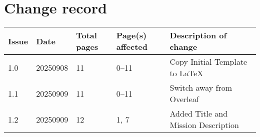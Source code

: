 
\section*{Change record}
\begin{table}[htp]
\centering
\renewcommand{\arraystretch}{1.2} %
\begin{tabularx}{\textwidth}{|l|l|l|l|X|}
\hline
Issue & Date & Total pages & Page(s) affected & Description of change \\
\hline
1.0 & 20250908 & 11 & 0--11 & Copy Initial Template to LaTeX \\
\hline
1.1 & 20250909 & 11 & 0--11 & Switch away from Overleaf \\
\hline
1.2 & 20250909 & 12 & 1, 7 & Added Title and Mission Description \\
\hline
\end{tabularx}
\end{table}

